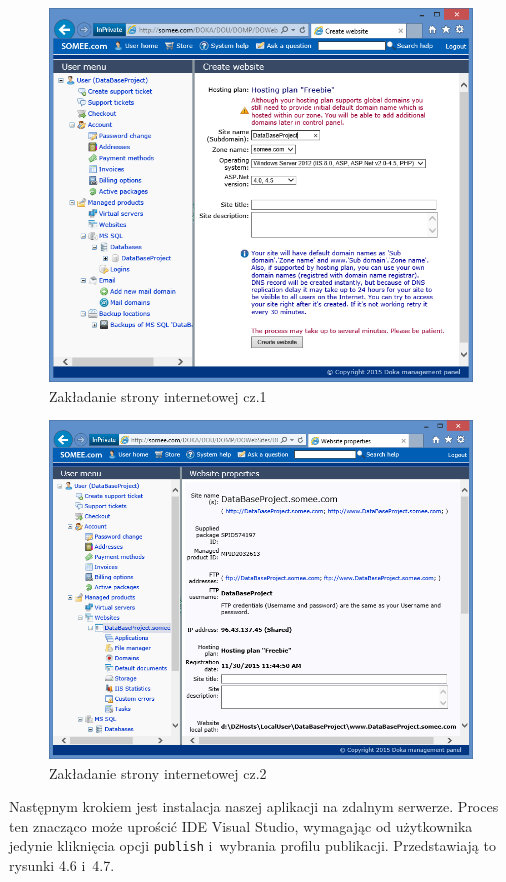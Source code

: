 \documentclass[a4paper,11pt]{article}
\begin{document}
\begin{figure}[H]
	\centering
	\includegraphics[width=\textwidth,height=0.6\textheight]{somee1.png}
	\caption{Zakładanie strony internetowej cz.1}
\end{figure}
\begin{figure}[H]
	\centering
	\includegraphics[width=\textwidth,height=0.6\textheight]{somee2.png}
	\caption{Zakładanie strony internetowej cz.2}
\end{figure}
Następnym krokiem jest instalacja naszej aplikacji na zdalnym serwerze. Proces ten znacząco może uprościć IDE Visual Studio, wymagając od użytkownika jedynie kliknięcia opcji \texttt{publish} i~wybrania profilu publikacji. Przedstawiają to rysunki 4.6 i~4.7.
\end{document}

